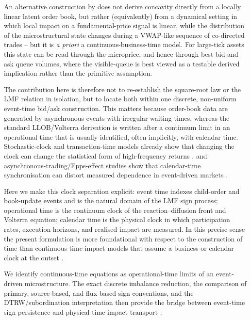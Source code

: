 \documentclass[5p,final]{elsarticle}
\begin{document}
An alternative construction by \citet{nadtochiy2022simple} does not derive concavity directly from a locally linear latent order book, but rather (equivalently) from a dynamical setting in which local impact on a fundamental-price signal is linear, while the distribution of the microstructural state changes during a VWAP-like sequence of co-directed trades -- but it is {\it a priori} a continuous-business-time model. For large-tick assets this state can be read through the microprice, and hence through best bid and ask queue volumes, where the visible-queue is best viewed as a testable derived implication rather than the primitive assumption. 

The contribution here is therefore not to re-establish the square-root law or the LMF relation in isolation, but to locate both within one discrete, non-uniform event-time bid/ask construction.  This matters because order-book data are generated by asynchronous events with irregular waiting times, whereas the standard LLOB/Volterra derivation is written after a continuum limit in an operational time that is usually identified, often implicitly, with calendar time.  Stochastic-clock and transaction-time models already show that changing the clock can change the statistical form of high-frequency returns \citep{clark1973subordinated,ane2000order}, and asynchronous-trading/Epps-effect studies show that calendar-time synchronisation can distort measured dependence in event-driven markets \citep{chang2020revisiting,gurgul2016impact}.  

Here we make this clock separation explicit: event time indexes child-order and book-update events and is the natural domain of the LMF sign process; operational time is the continuum clock of the reaction--diffusion front and Volterra equation; calendar time is the physical clock in which participation rates, execution horizons, and realised impact are measured.  In this precise sense the present formulation is more foundational with respect to the construction of time than continuous-time impact models that assume a business or calendar clock at the outset \cite{nadtochiy2022simple}.

We identify continuous-time equations as operational-time limits of an event-driven microstructure. The exact discrete imbalance reduction, the comparison of primary, source-based, and flux-based sign conventions, and the DTRW/subordination interpretation then provide the bridge between event-time sign persistence and physical-time impact transport \citep{angstmann2015dtrw,meerschaert2012fractional,diana2024anomalous,angstmann2026nonunique}.
\end{document}

